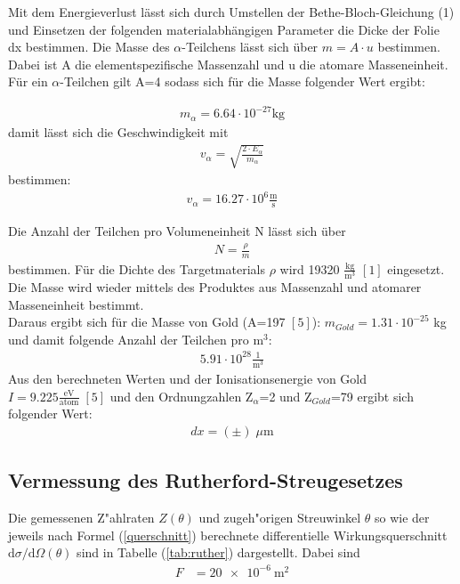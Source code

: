 Mit dem Energieverlust lässt sich durch Umstellen der Bethe-Bloch-Gleichung (1) und Einsetzen der folgenden materialabhängigen Parameter die Dicke der Folie dx bestimmen.  
Die Masse des $\alpha$-Teilchens lässt sich über $m=A \cdot u$ bestimmen. Dabei ist A die elementspezifische Massenzahl und u die atomare Masseneinheit. Für ein $\alpha$-Teilchen gilt A=4 sodass sich für die Masse folgender Wert ergibt: 

\begin{align*}
m_{\alpha}= 6.64 \cdot 10^{-27} \text{kg} 
\end{align*} 
damit lässt sich die Geschwindigkeit mit \begin{align*}
v_{\alpha}= \sqrt{\frac{2\cdot E_{\alpha}}{m_{\alpha}}} 
\end{align*} 
bestimmen:
\begin{align*}
v_{\alpha}=16.27 \cdot 10^{6} \frac{\text{m}}{\text{s}}
\end{align*} 

Die Anzahl der Teilchen pro Volumeneinheit N lässt sich über \begin{align}
N= \frac{\rho}{m} 
\end{align} bestimmen. Für die Dichte des Targetmaterials $\rho$ wird 19320 $\frac{\text{kg}}{\text{m}^3}$ $[1]$ eingesetzt. Die Masse wird wieder mittels des Produktes aus Massenzahl und atomarer Masseneinheit bestimmt. \\ Daraus ergibt sich für die Masse von Gold (A=197 $[5]$): $m_{Gold}=1.31 \cdot 10^{-25}$ kg und damit folgende  Anzahl der Teilchen pro $\text{m}^3$: 
 \begin{align*}
 5.91 \cdot 10^{28} \frac{1}{\text{m}^3}
 \end{align*} 
 Aus den berechneten Werten und der Ionisationsenergie von Gold $I=9.225 \frac{\text{eV}}{\text{atom}} \; [5]$ und den Ordnungzahlen Z$_{\alpha}$=2 und Z$_{Gold}$=79 ergibt sich folgender Wert:
 \begin{align*}
 dx= ( \pm ) \; \mu \text{m}
 \end{align*}

\subsection{Vermessung des Rutherford-Streugesetzes}
  Die gemessenen Z"ahlraten $Z(\theta)$ und zugeh"origen Streuwinkel $\theta$ so wie der jeweils nach Formel (\ref{querschnitt}) berechnete differentielle Wirkungsquerschnitt $\text{d}\sigma/\text{d}\Omega(\theta)$ sind in Tabelle (\ref{tab:ruther}) dargestellt.
  Dabei sind
  \begin{align*}
    F &= \SI{20e-6}{\meter \squared} \\
  \end{align*}



